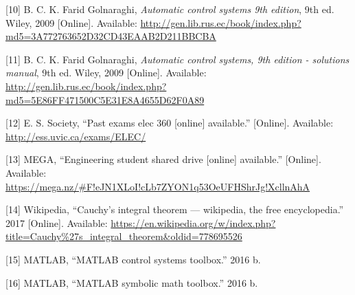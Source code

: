 \hypertarget{ref-textbook:kuo}{}
{[}10{]} B. C. K. Farid Golnaraghi, \emph{Automatic control systems 9th
edition}, 9th ed. Wiley, 2009 {[}Online{]}. Available:
\url{http://gen.lib.rus.ec/book/index.php?md5=3A772763652D32CD43EAAB2D211BBCBA}

\hypertarget{ref-textbook:kuoSolutions}{}
{[}11{]} B. C. K. Farid Golnaraghi, \emph{Automatic control systems, 9th
edition - solutions manual}, 9th ed. Wiley, 2009 {[}Online{]}.
Available:
\url{http://gen.lib.rus.ec/book/index.php?md5=5E86FF471500C5E31E8A4655D62F0A89}

\hypertarget{ref-essElec360:Online}{}
{[}12{]} E. S. Society, ``Past exams elec 360 {[}online{]} available.''
{[}Online{]}. Available: \url{http://ess.uvic.ca/exams/ELEC/}

\hypertarget{ref-megaElec360:Online}{}
{[}13{]} MEGA, ``Engineering student shared drive {[}online{]}
available.'' {[}Online{]}. Available:
\url{https://mega.nz/\#F!eJN1XLoI!cLb7ZYON1q53OeUFHShrJg!XcllnAhA}

\hypertarget{ref-wiki:Cauchy}{}
{[}14{]} Wikipedia, ``Cauchy's integral theorem --- wikipedia, the free
encyclopedia.'' 2017 {[}Online{]}. Available:
\url{https://en.wikipedia.org/w/index.php?title=Cauchy\%27s_integral_theorem\&oldid=778695526}

\hypertarget{ref-MatlabCST}{}
{[}15{]} MATLAB, ``MATLAB control systems toolbox.'' 2016 b.

\hypertarget{ref-MatlabSMT}{}
{[}16{]} MATLAB, ``MATLAB symbolic math toolbox.'' 2016 b.
